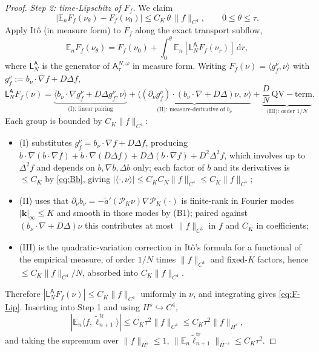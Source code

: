 \documentclass[a4paper,fleqn]{cas-sc}
\theoremstyle{definition}
\theoremstyle{remark}
\begin{document}
\begin{proof}
\emph{Step 2: time-Lipschitz of $F_f$.} We claim
\begin{equation}\label{eq:F-Lip}
|\mathbb E_nF_f(\nu_\theta)-F_f(\nu_0)|\le C_K\,\theta\,\|f\|_{C^4},
\qquad 0\le\theta\le\tau.
\end{equation}
Apply It\^o (in measure form) to $F_f$ along the exact transport subflow,
\[
\mathbb E_nF_f(\nu_\theta)=F_f(\nu_0)+\int_0^\theta\mathbb E_n[\mathsf L^{\mathsf A}_NF_f(\nu_r)]\,\mathrm dr,
\]
where $\mathsf L^{\mathsf A}_N$ is the generator of $\mathsf A^{N,\omega}_\tau$ in
measure form. Writing $F_f(\nu)=\langle g_f^\nu,\nu\rangle$ with
$g_f^\nu:=b_\nu\!\cdot\!\nabla f+D\Delta f$,
\[
\mathsf L^{\mathsf A}_N F_f(\nu)
=\underbrace{\langle b_\nu\!\cdot\!\nabla g_f^\nu+D\Delta g_f^\nu,\nu\rangle}_{\text{(I): linear pairing}}
+\underbrace{\bigl\langle(\partial_\nu g_f^\nu)\cdot(b_\nu\!\cdot\!\nabla\!+\!D\Delta)\nu,\,\nu\bigr\rangle}_{\text{(II): measure-derivative of }b_\nu}
+\underbrace{\frac{D}{N}\,\mathrm{QV-term}}_{\text{(III): order $1/N$}}.
\]
Each group is bounded by $C_K\|f\|_{C^4}$:
\begin{itemize}
\item (I) substitutes $g_f^\nu=b_\nu\!\cdot\!\nabla f+D\Delta f$, producing
$b\!\cdot\!\nabla(b\!\cdot\!\nabla f)+b\!\cdot\!\nabla(D\Delta f)+D\Delta(b\!\cdot\!\nabla f)+D^2\Delta^2f$,
which involves up to $\Delta^2f$ and depends on $b,\nabla b,\Delta b$ only;
each factor of $b$ and its derivatives is $\le C_K$ by \eqref{eq:Bb},
giving $|\langle\cdot,\nu\rangle|\le C_K C_N\|f\|_{C^4}\le C_K\|f\|_{C^4}$;
\item (II) uses that $\partial_\nu b_\nu=-\tilde a'(\mathcal P_K\nu)\nabla\mathcal P_K(\cdot)$
is finite-rank in Fourier modes $|\mathbf k|_\infty\le K$ and smooth in those modes
by (B1); paired against $(b_\nu\!\cdot\!\nabla+D\Delta)\nu$ this contributes at
most $\|f\|_{C^3}$ in $f$ and $C_K$ in coefficients;
\item (III) is the quadratic-variation correction in It\^o's formula for a
functional of the empirical measure, of order $1/N$ times $\|f\|_{C^4}$ and
fixed-$K$ factors, hence $\le C_K\|f\|_{C^4}/N$, absorbed into $C_K\|f\|_{C^4}$.
\end{itemize}
Therefore $|\mathsf L^{\mathsf A}_N F_f(\nu)|\le C_K\|f\|_{C^4}$ uniformly in
$\nu$, and integrating gives \eqref{eq:F-Lip}. Inserting into Step 1 and using
$H^s\hookrightarrow C^4$,
\[
|\mathbb E_n\langle f,\tilde\ell^{\mathrm{tr}}_{n+1}\rangle|\le C_K\tau^2\|f\|_{C^4}\le C_K\tau^2\|f\|_{H^s},
\]
and taking the supremum over $\|f\|_{H^s}\le1$,
$\|\mathbb E_n\tilde\ell^{\mathrm{tr}}_{n+1}\|_{H^{-s}}\le C_K\tau^2$.


\end{proof}
\end{document}
